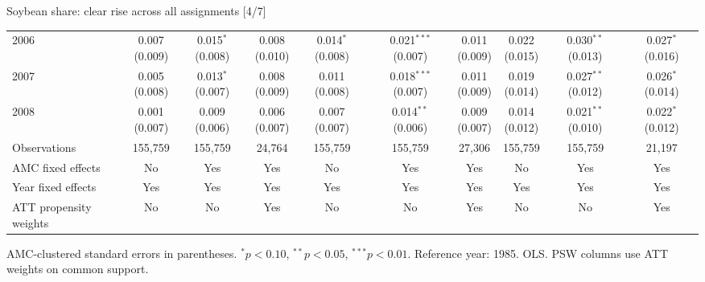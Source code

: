 \documentclass[aspectratio=169]{beamer}
\begin{document}
\begin{frame}{Soybean share: clear rise across all assignments [4/7]}
{\begin{tabular}{@{}l*{9}{c}@{}}
2006 & \shortstack{0.007\\(0.009)} & \shortstack{0.015$^{*}$\\(0.008)} & \shortstack{0.008\\(0.010)} & \shortstack{0.014$^{*}$\\(0.008)} & \shortstack{0.021$^{***}$\\(0.007)} & \shortstack{0.011\\(0.009)} & \shortstack{0.022\\(0.015)} & \shortstack{0.030$^{**}$\\(0.013)} & \shortstack{0.027$^{*}$\\(0.016)} \\
2007 & \shortstack{0.005\\(0.008)} & \shortstack{0.013$^{*}$\\(0.007)} & \shortstack{0.008\\(0.009)} & \shortstack{0.011\\(0.008)} & \shortstack{0.018$^{***}$\\(0.007)} & \shortstack{0.011\\(0.009)} & \shortstack{0.019\\(0.014)} & \shortstack{0.027$^{**}$\\(0.012)} & \shortstack{0.026$^{*}$\\(0.014)} \\
2008 & \shortstack{0.001\\(0.007)} & \shortstack{0.009\\(0.006)} & \shortstack{0.006\\(0.007)} & \shortstack{0.007\\(0.007)} & \shortstack{0.014$^{**}$\\(0.006)} & \shortstack{0.009\\(0.007)} & \shortstack{0.014\\(0.012)} & \shortstack{0.021$^{**}$\\(0.010)} & \shortstack{0.022$^{*}$\\(0.012)} \\
\midrule
Observations & 155,759 & 155,759 & 24,764 & 155,759 & 155,759 & 27,306 & 155,759 & 155,759 & 21,197 \\
AMC fixed effects & No & Yes & Yes & No & Yes & Yes & No & Yes & Yes \\
Year fixed effects & Yes & Yes & Yes & Yes & Yes & Yes & Yes & Yes & Yes \\
ATT propensity weights & No & No & Yes & No & No & Yes & No & No & Yes \\
\bottomrule
\end{tabular}%
}
\vspace{0.1em}
{\tiny\color{ZMidGray} AMC-clustered standard errors in parentheses. $^{*}p<0.10$, $^{**}p<0.05$, $^{***}p<0.01$. Reference year: 1985. OLS. PSW columns use ATT weights on common support.}
\end{frame}
\end{document}
